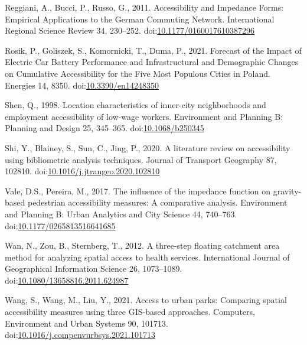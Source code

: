 \documentclass[]{elsarticle} %
\newlength{\cslhangindent}
\newlength{\cslentryspacingunit} %
\newenvironment{CSLReferences}[2] %
 {%
  \setlength{\parindent}{0pt}
  \ifodd #1
  \let\oldpar\par
  \def\par{\hangindent=\cslhangindent\oldpar}
  \fi
  \setlength{\parskip}{#2\cslentryspacingunit}
 }%
 {}
\begin{document}
\begin{CSLReferences}{1}{0}
\leavevmode{}%
Reggiani, A., Bucci, P., Russo, G., 2011. Accessibility and {Impedance}
{Forms}: {Empirical} {Applications} to the {German} {Commuting}
{Network}. International Regional Science Review 34, 230--252.
doi:\href{https://doi.org/10.1177/0160017610387296}{10.1177/0160017610387296}

\leavevmode{}%
Rosik, P., Goliszek, S., Komornicki, T., Duma, P., 2021. Forecast of the
{Impact} of {Electric} {Car} {Battery} {Performance} and
{Infrastructural} and {Demographic} {Changes} on {Cumulative}
{Accessibility} for the {Five} {Most} {Populous} {Cities} in {Poland}.
Energies 14, 8350.
doi:\href{https://doi.org/10.3390/en14248350}{10.3390/en14248350}

\leavevmode{}%
Shen, Q., 1998. Location characteristics of inner-city neighborhoods and
employment accessibility of low-wage workers. Environment and Planning
B: Planning and Design 25, 345--365.
doi:\href{https://doi.org/10.1068/b250345}{10.1068/b250345}

\leavevmode{}%
Shi, Y., Blainey, S., Sun, C., Jing, P., 2020. A literature review on
accessibility using bibliometric analysis techniques. Journal of
Transport Geography 87, 102810.
doi:\href{https://doi.org/10.1016/j.jtrangeo.2020.102810}{10.1016/j.jtrangeo.2020.102810}

\leavevmode{}%
Vale, D.S., Pereira, M., 2017. The influence of the impedance function
on gravity-based pedestrian accessibility measures: {A} comparative
analysis. Environment and Planning B: Urban Analytics and City Science
44, 740--763.
doi:\href{https://doi.org/10.1177/0265813516641685}{10.1177/0265813516641685}

\leavevmode{}%
Wan, N., Zou, B., Sternberg, T., 2012. A three-step floating catchment
area method for analyzing spatial access to health services.
International Journal of Geographical Information Science 26,
1073--1089.
doi:\href{https://doi.org/10.1080/13658816.2011.624987}{10.1080/13658816.2011.624987}

\leavevmode{}%
Wang, S., Wang, M., Liu, Y., 2021. Access to urban parks: {Comparing}
spatial accessibility measures using three {GIS}-based approaches.
Computers, Environment and Urban Systems 90, 101713.
doi:\href{https://doi.org/10.1016/j.compenvurbsys.2021.101713}{10.1016/j.compenvurbsys.2021.101713}


\end{CSLReferences}
\end{document}
